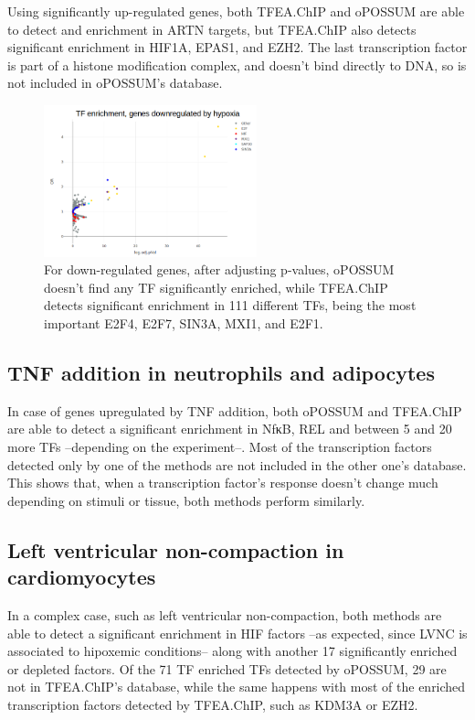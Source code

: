 \documentclass[a4paper, 12pt ]{article}
\begin{document}
Using significantly up-regulated genes, both TFEA.ChIP and oPOSSUM are able to detect and enrichment in ARTN targets, but TFEA.ChIP also detects significant enrichment in HIF1A, EPAS1, and EZH2. The last transcription factor is part of a histone modification complex, and doesn’t bind directly to DNA, so is not included in oPOSSUM’s database.
\begin{figure}
	\centering
	\includegraphics[width=0.55\textwidth]{graf-op1}
	\caption{For down-regulated genes, after adjusting p-values, oPOSSUM doesn’t find any TF significantly enriched, while TFEA.ChIP detects significant enrichment in 111 different TFs, being the most important E2F4, E2F7, SIN3A, MXI1, and E2F1.}
\end{figure}


\subsection*{TNF addition in neutrophils and adipocytes}
In case of genes upregulated by TNF addition, both oPOSSUM and TFEA.ChIP are able to detect a significant enrichment in NfκB, REL and between 5 and 20 more TFs –depending on the experiment–. Most of the transcription factors detected only by one of the methods are not included in the other one’s database. This shows that, when a transcription factor’s response doesn’t change much depending on stimuli or tissue, both methods perform similarly.

\subsection*{Left ventricular non-compaction in cardiomyocytes}
In a complex case, such as left ventricular non-compaction, both methods are able to detect a significant enrichment in HIF factors –as expected, since LVNC is associated to hipoxemic conditions– along with another 17 significantly enriched or depleted factors.
Of the 71 TF enriched TFs detected by oPOSSUM, 29 are not in TFEA.ChIP’s database, while the same happens with most of the enriched transcription factors detected by TFEA.ChIP, such as KDM3A or EZH2.
\end{document}
